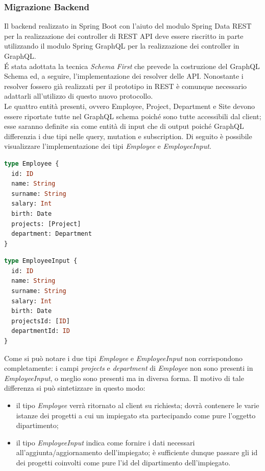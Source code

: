 \subsubsection*{Migrazione Backend}
Il backend realizzato in Spring Boot con l'aiuto del modulo Spring Data REST per la realizzazione dei controller di REST API deve essere riscritto in parte utilizzando il modulo Spring GraphQL per la realizzazione dei controller in GraphQL.\\
É stata adottata la tecnica \textit{Schema First} che prevede la costruzione del GraphQL Schema ed, a seguire, l'implementazione dei resolver delle API. Nonostante i resolver fossero già realizzati per il prototipo in REST è comunque necessario adattarli all'utilizzo di questo nuovo protocollo.\\
Le quattro entità presenti, ovvero Employee, Project, Department e Site devono essere riportate tutte nel GraphQL schema poiché sono tutte accessibili dal client; esse saranno definite sia come entità di input che di output poiché GraphQL differenzia i due tipi nelle query, mutation e subscription. Di seguito è possibile visualizzare l'implementazione dei tipi \textit{Employee} e \textit{EmployeeInput}.
\begin{lstlisting}[language=GraphQL, title={schema.graphqls}]
type Employee {
  id: ID
  name: String
  surname: String
  salary: Int
  birth: Date
  projects: [Project]
  department: Department
}
\end{lstlisting}
\begin{lstlisting}[language=GraphQL, title={schema.graphqls}]
type EmployeeInput {
  id: ID
  name: String
  surname: String
  salary: Int
  birth: Date
  projectsId: [ID]
  departmentId: ID
}
\end{lstlisting}
Come si può notare i due tipi \textit{Employee} e \textit{EmployeeInput} non corrispondono completamente: i campi \textit{projects} e \textit{department} di \textit{Employee} non sono presenti in \textit{EmployeeInput}, o  meglio sono presenti ma in diversa forma. Il motivo di tale differenza si può sintetizzare in questo modo:
\begin{itemize}
  \item il tipo \textit{Employee} verrà ritornato al client su richiesta; dovrà contenere le varie istanze dei progetti a cui un impiegato sta partecipando come pure l'oggetto dipartimento;
  \item il tipo \textit{EmployeeInput} indica come fornire i dati necessari all'aggiunta/aggiornamento dell'impiegato; è sufficiente dunque passare gli id dei progetti coinvolti come pure l'id del dipartimento dell'impiegato.
\end{itemize}
